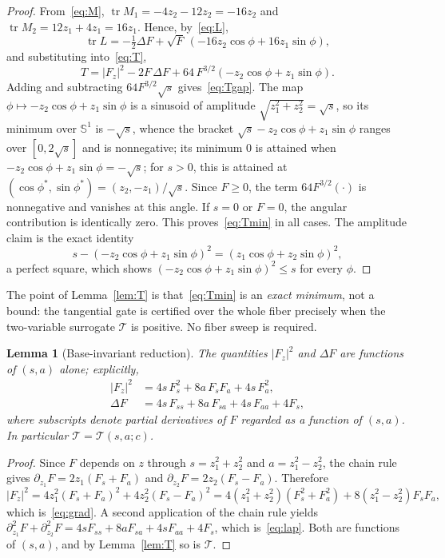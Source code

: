 \documentclass[11pt,reqno]{amsart}
\theoremstyle{plain}
\newtheorem{lemma}[theorem]{Lemma}
\theoremstyle{definition}
\DeclareMathOperator{\tr}{tr}
\newcommand{\Sph}{\mathbb{S}}
\newcommand{\calT}{\mathcal{T}}
\newcommand{\Fz}{F_{z}}
\begin{document}
\begin{proof}
From~\eqref{eq:M}, $\tr M_1=-4z_2-12z_2=-16z_2$ and $\tr M_2=12z_1+4z_1=16z_1$. Hence, by~\eqref{eq:L},
\[
\tr L=-\tfrac12\Delta F+\sqrt{F}\,(-16z_2\cos\phi+16z_1\sin\phi),
\]
and substituting into~\eqref{eq:T},
\[
T=|\Fz|^2-2F\,\Delta F+64\,F^{3/2}(-z_2\cos\phi+z_1\sin\phi).
\]
Adding and subtracting $64F^{3/2}\sqrt{s}$ gives~\eqref{eq:Tgap}. The map $\phi\mapsto -z_2\cos\phi+z_1\sin\phi$ is a sinusoid of amplitude $\sqrt{z_1^2+z_2^2}=\sqrt{s}$, so its minimum over $\Sph^1$ is $-\sqrt{s}$, whence the bracket $\sqrt{s}-z_2\cos\phi+z_1\sin\phi$ ranges over $[0,2\sqrt{s}]$ and is nonnegative; its minimum $0$ is attained when $-z_2\cos\phi+z_1\sin\phi=-\sqrt{s}$; for $s>0$, this is attained at $(\cos\phi^\ast,\sin\phi^\ast)=(z_2,-z_1)/\sqrt{s}$. Since $F\ge0$, the term $64F^{3/2}(\cdot)$ is nonnegative and vanishes at this angle. If $s=0$ or $F=0$, the angular contribution is identically zero. This proves~\eqref{eq:Tmin} in all cases. The amplitude claim is the exact identity
\begin{equation}\label{eq:sq}
s-(-z_2\cos\phi+z_1\sin\phi)^2=(z_1\cos\phi+z_2\sin\phi)^2,
\end{equation}
a perfect square, which shows $(-z_2\cos\phi+z_1\sin\phi)^2\le s$ for every $\phi$.
\end{proof}

The point of Lemma~\ref{lem:T} is that~\eqref{eq:Tmin} is an \emph{exact minimum}, not a bound: the tangential gate is certified over the whole fiber precisely when the two-variable surrogate $\calT$ is positive. No fiber sweep is required.

\begin{lemma}[Base-invariant reduction]\label{lem:sa}
The quantities $|\Fz|^2$ and $\Delta F$ are functions of $(s,a)$ alone; explicitly,
\begin{align}
|\Fz|^2&=4s\,F_s^2+8a\,F_sF_a+4s\,F_a^2,\label{eq:grad}\\
\Delta F&=4s\,F_{ss}+8a\,F_{sa}+4s\,F_{aa}+4F_s,\label{eq:lap}
\end{align}
where subscripts denote partial derivatives of $F$ regarded as a function of $(s,a)$. In particular $\calT=\calT(s,a;c)$.
\end{lemma}

\begin{proof}
Since $F$ depends on $z$ through $s=z_1^2+z_2^2$ and $a=z_1^2-z_2^2$, the chain rule gives $\partial_{z_1}F=2z_1(F_s+F_a)$ and $\partial_{z_2}F=2z_2(F_s-F_a)$. Therefore
\[
|\Fz|^2=4z_1^2(F_s+F_a)^2+4z_2^2(F_s-F_a)^2
=4(z_1^2+z_2^2)(F_s^2+F_a^2)+8(z_1^2-z_2^2)F_sF_a,
\]
which is~\eqref{eq:grad}. A second application of the chain rule yields $\partial_{z_1}^2F+\partial_{z_2}^2F=4sF_{ss}+8aF_{sa}+4sF_{aa}+4F_s$, which is~\eqref{eq:lap}. Both are functions of $(s,a)$, and by Lemma~\ref{lem:T} so is $\calT$.
\end{proof}
\end{document}

